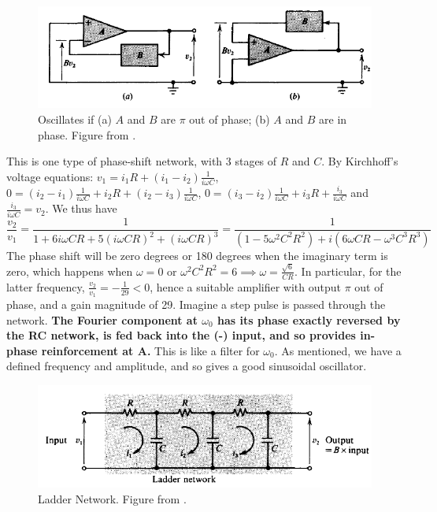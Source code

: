 \documentclass[a4paper]{article}
\begin{document}
\begin{figure}[H]
    \centering
    \includegraphics[scale=0.75]{oscillator.PNG}
    \caption{Oscillates if (a) $A$ and $B$ are $\pi$ out of phase; (b) $A$ and $B$ are in phase. Figure from \cite{ahmed_spreadbury_1984}.}
    \label{oscillator}
\end{figure}
\begin{eg}
This is one type of phase-shift network, with 3 stages of $R$ and $C$. By Kirchhoff's voltage equations: $v_1=i_1R+(i_1-i_2)\frac{1}{i\omega C}$, $0=(i_2-i_1)\frac{1}{i\omega C}+i_2R+(i_2-i_3)\frac{1}{i\omega C}$, $0=(i_3-i_2)\frac{1}{i\omega C}+i_3R+\frac{i_3}{i\omega C}$ and $\frac{i_3}{i\omega C}=v_2$. We thus have
$$\frac{v_2}{v_1}=\frac{1}{1+6i\omega CR+5(i\omega CR)^2+(i\omega CR)^3}=\frac{1}{(1-5\omega^2C^2R^2)+i(6\omega CR-\omega^3C^3R^3)}$$
The phase shift will be zero degrees or 180 degrees when the imaginary term is zero, which happens when $\omega=0$ or $\omega^2C^2R^2=6\implies\omega=\frac{\sqrt{6}}{CR}$. In particular, for the latter frequency, $\frac{v_2}{v_1}=-\frac{1}{29}<0$, hence a suitable amplifier with output $\pi$ out of phase, and a gain magnitude of 29. Imagine a step pulse is passed through the network. \textbf{The Fourier component at $\omega_0$ has its phase exactly reversed by the RC network, is fed back into the (-) input, and so provides in-phase reinforcement at A.} This is like a filter for $\omega_0$. As mentioned, we have a defined frequency and amplitude, and so gives a good sinusoidal oscillator.
\end{eg}
\begin{figure}[H]
    \centering
    \includegraphics[scale=0.65]{laddernetwork.PNG}
    \caption{Ladder Network. Figure from \cite{ahmed_spreadbury_1984}.}
    \label{laddernetwork}
\end{figure}
\end{document}

